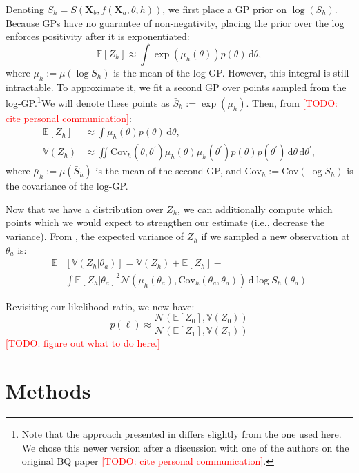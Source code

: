 \documentclass[10pt,letterpaper]{article}
\newcommand{\TODO}[1]{\textcolor{red}{[TODO: #1]}}
\newcommand{\Xa}[0]{\mathbf{X}_a}
\newcommand{\Xb}[0]{\mathbf{X}_b}
\newcommand{\dif}[0]{\,\mathrm{d}}
\begin{document}
Denoting $S_h=S(\Xb, f(\Xa, \theta, h))$, we first place a GP prior on
$\log(S_h)$. Because GPs have no guarantee of non-negativity, placing
the prior over the log enforces positivity after it is exponentiated:
\begin{equation}
\mathbb{E}[Z_h] \approx \int \exp(\mu_h(\theta))p(\theta)\dif\theta,
\end{equation}
where $\mu_h:=\mu(\log S_h)$ is the mean of the log-GP. However, this
integral is still intractable. To approximate it, we fit a second GP
over points sampled from the log-GP.\footnote{Note that the approach
  presented in \cite{Osborne:2012tm} differs slightly from the one
  used here. We chose this newer version after a discussion with one
  of the authors on the original BQ paper \TODO{cite personal
    communication}.}We will denote these points as
$\bar{S}_h:=\exp(\mu_h)$. Then, from \TODO{cite personal
  communication}:
\begin{align}
  \mathbb{E}[Z_h] &\approx \int \bar{\mu}_h(\theta)p(\theta)\dif\theta,\\
  \mathbb{V}(Z_h) &\approx \iint \mathrm{Cov}_h(\theta,
  \theta^\prime)\bar{\mu}_h(\theta)\bar{\mu}_h(\theta^\prime)p(\theta)p(\theta^\prime)\dif\theta\dif\theta^\prime,
\end{align}
where $\bar{\mu}_h:=\mu(\bar{S}_h)$ is the mean of the second GP, and
$\mathrm{Cov}_h:=\mathrm{Cov}(\log S_h)$ is the covariance of the
log-GP.

Now that we have a distribution over $Z_h$, we can additionally
compute which points which we would expect to strengthen our estimate
(i.e., decrease the variance). From \cite{Osborne:2012tm}, the
expected variance of $Z_h$ if we sampled a new observation at
$\theta_a$ is:
\begin{align}
\mathbb{E}&[\mathbb{V}(Z_h|\theta_a)]=\mathbb{V}(Z_h) + \mathbb{E}[Z_h] - \\
&\int \mathbb{E}[Z_h|\theta_{a}]^2 \mathcal{N}(\mu_h(\theta_a), \mathrm{Cov}_h(\theta_a, \theta_a))\dif\log S_h(\theta_a)\nonumber
\label{ref:expected-variance}
\end{align}

Revisiting our likelihood ratio, we now have:
\begin{equation}
p(\ell)\approx\frac{\mathcal{N}(\mathbb{E}[Z_0], \mathbb{V}(Z_0))}{\mathcal{N}(\mathbb{E}[Z_1], \mathbb{V}(Z_1))}
\end{equation}
\TODO{figure out what to do here.}


\section{Methods}
\end{document}

